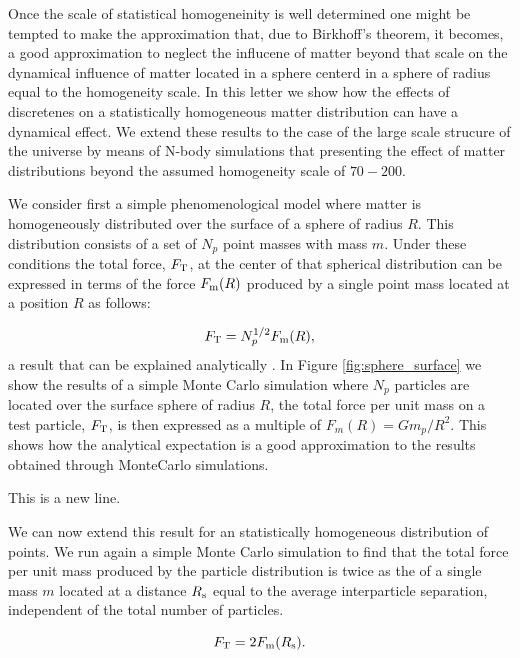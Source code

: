 \documentclass{article}
\newcommand{\hMpc}{{\ifmmode{h^{-1}{\rm Mpc}}\else{$h^{-1}$Mpc }\fi}}
\begin{document}
Once the scale of statistical homogeneinity is well determined one
might be tempted to make the approximation that,
due to Birkhoff's theorem, it becomes, a good approximation to neglect
the influcene of matter beyond that scale on the dynamical influence
of matter located in a sphere centerd in a sphere of radius equal to
the homogeneity scale.  In this letter we show how the effects of
discretenes on a statistically homogeneous matter distribution can
have a dynamical effect. We extend these results to the case of the
large scale strucure of the universe by means of N-body simulations
that presenting the effect of matter distributions beyond the assumed
homogeneity scale of $70-200$\hMpc.
 


 We consider first a simple phenomenological model where matter is
homogeneously distributed over the surface of a sphere of radius
$R$. This distribution consists of a set of $N_p$ point masses with mass
$m$. Under these conditions the total force, $F_{\rm T}$, at the
center of that spherical distribution can be expressed in terms of the
force $F_{\rm m}(R)$ produced by a single point mass located at a
position  $R$ as follows:  

\begin{equation}
F_{\rm T } = N_p^{1/2} F_{\rm m} (R),
\end{equation}
%
a result that can be explained analytically
\cite{Chandra43,Carati2008}. In Figure \ref{fig:sphere_surface} we
show the results of a simple Monte Carlo simulation where $N_p$
particles are located over the surface sphere of radius $R$, the total force per
unit mass on a test particle, $F_{\rm T}$, is then expressed as a
multiple of $F_{m}(R)=Gm_p/R^2$. This shows how the analytical
expectation is a good approximation to the results obtained through
MonteCarlo simulations. 

This is a new line.




We can now extend this result for an statistically homogeneous distribution
of points. We run again a simple Monte Carlo simulation to find that the total force per unit mass produced by the particle distribution is twice as
the of a single mass $m$ located at a distance $R_{\rm s}$ equal to
the average interparticle separation, independent of the total number of
particles. 

\begin{equation}
F_{\rm T} = 2 F_{\rm m}(R_{\rm s}).
\end{equation}
\end{document}
